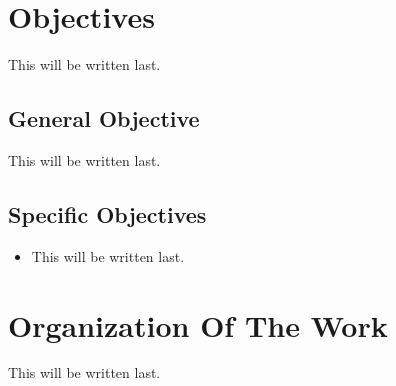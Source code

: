 \section{Objectives}

	This will be written last.

\subsection{General Objective}

	This will be written last.

\subsection{Specific Objectives}
   \begin{itemize}
		\item This will be written last.
   \end{itemize}

\section{Organization Of The Work}

	This will be written last.